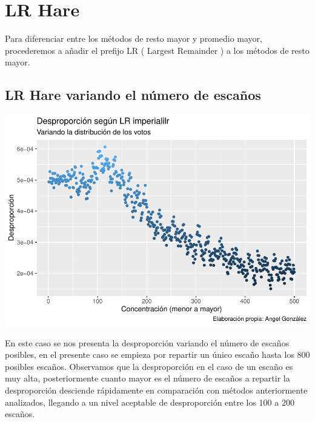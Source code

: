 \documentclass[12pt,a4paper,]{book}
\newenvironment{Shaded}{\begin{snugshade}}{\end{snugshade}}
\newcommand{\FunctionTok}[1]{\textcolor[rgb]{0.00,0.00,0.00}{#1}}
\newcommand{\NormalTok}[1]{#1}
\numberwithin{dummy}{section}
\theoremstyle{ocrenumbox}
\theoremstyle{blacknumex}
\theoremstyle{blacknumbox}
\theoremstyle{ocrenum}
\theoremstyle{ocrenum}
\begin{document}
\hypertarget{lr-hare}{%
\section{LR Hare}\label{lr-hare}}

\begin{Shaded}
\begin{Highlighting}[]
\NormalTok{Para diferenciar entre los métodos de resto mayor y promedio mayor, }
\NormalTok{procederemos a añadir el prefijo }\FunctionTok{LR}\NormalTok{ ( Largest Remainder ) }
\NormalTok{a los métodos de resto mayor.}
\end{Highlighting}
\end{Shaded}

\hypertarget{lr-hare-variando-el-nuxfamero-de-escauxf1os}{%
\subsection{LR Hare variando el número de
escaños}\label{lr-hare-variando-el-nuxfamero-de-escauxf1os}}

\begin{center}\includegraphics[width=0.95\linewidth]{figurasR/unnamed-chunk-53-1} \end{center}

En este caso se nos presenta la desproporción variando el número de
escaños posibles, en el presente caso se empieza por repartir un único
escaño hasta los 800 posibles escaños. Observamos que la desproporción
en el caso de un escaño es muy alta, posteriormente cuanto mayor es el
número de escaños a repartir la desproporción desciende rápidamente en
comparación con métodos anteriormente analizados, llegando a un nivel
aceptable de desproporción entre los 100 a 200 escaños.
\end{document}
